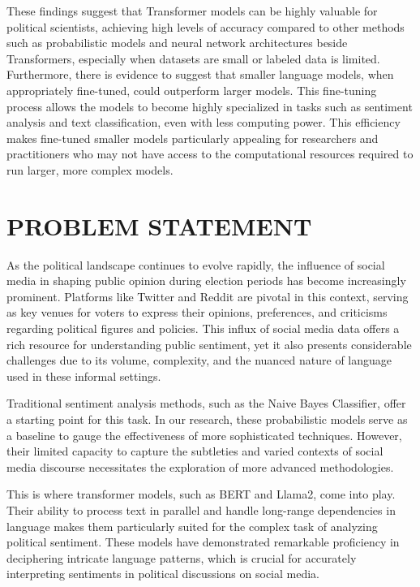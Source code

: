 \documentclass[10pt]{article}
\begin{document}
\begin{multicols}{2}
These findings suggest that Transformer models can be highly valuable for political scientists, achieving high levels of accuracy compared to other methods such as probabilistic models and neural network architectures beside Transformers, especially when datasets are small or labeled data is limited. Furthermore, there is evidence to suggest that smaller language models, when appropriately fine-tuned, could outperform larger models. This fine-tuning process allows the models to become highly specialized in tasks such as sentiment analysis and text classification, even with less computing power. This efficiency makes fine-tuned smaller models particularly appealing for researchers and practitioners who may not have access to the computational resources required to run larger, more complex models.


\section{PROBLEM STATEMENT}

As the political landscape continues to evolve rapidly, the influence of social media in shaping public opinion during election periods has become increasingly prominent. Platforms like Twitter and Reddit are pivotal in this context, serving as key venues for voters to express their opinions, preferences, and criticisms regarding political figures and policies. This influx of social media data offers a rich resource for understanding public sentiment, yet it also presents considerable challenges due to its volume, complexity, and the nuanced nature of language used in these informal settings.

Traditional sentiment analysis methods, such as the Naive Bayes Classifier, offer a starting point for this task. In our research, these probabilistic models serve as a baseline to gauge the effectiveness of more sophisticated techniques. However, their limited capacity to capture the subtleties and varied contexts of social media discourse necessitates the exploration of more advanced methodologies.

This is where transformer models, such as BERT and Llama2, come into play. Their ability to process text in parallel and handle long-range dependencies in language makes them particularly suited for the complex task of analyzing political sentiment. These models have demonstrated remarkable proficiency in deciphering intricate language patterns, which is crucial for accurately interpreting sentiments in political discussions on social media.


\end{multicols}
\end{document}
